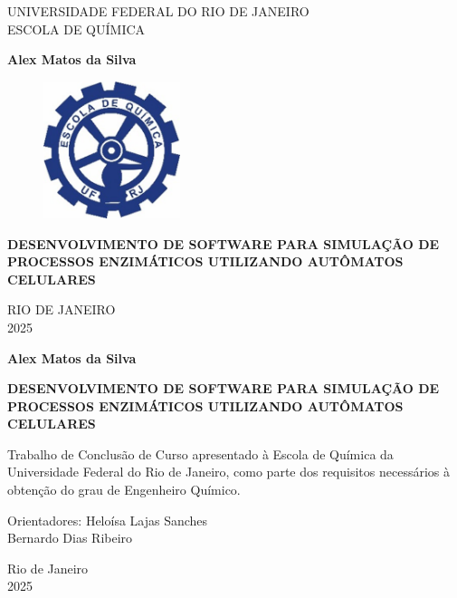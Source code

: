 \documentclass[12pt,oneside]{report}
\begin{document}
\onehalfspacing

\begin{titlepage}
    \begin{center}
        \large
        UNIVERSIDADE FEDERAL DO RIO DE JANEIRO \\
        ESCOLA DE QUÍMICA

        \vspace{2cm}

        \textbf{Alex Matos da Silva}

        \vspace{2cm}

        \begin{figure}[htp]
            \centering
            \includegraphics[width=4cm]{Logo-EQ.jpg}
        \end{figure}

        \vspace{2cm}

        \textbf{\Large DESENVOLVIMENTO DE SOFTWARE PARA SIMULAÇÃO DE PROCESSOS ENZIMÁTICOS UTILIZANDO AUTÔMATOS CELULARES}

        \vfill

        RIO DE JANEIRO \\
        2025
    \end{center}
\end{titlepage}

\begin{titlepage}
    \begin{center}
        \textbf{Alex Matos da Silva}

        \vfill

        \textbf{\Large DESENVOLVIMENTO DE SOFTWARE PARA SIMULAÇÃO DE PROCESSOS ENZIMÁTICOS UTILIZANDO AUTÔMATOS CELULARES}

        \vfill

    \end{center}
    Trabalho de Conclusão de Curso apresentado à Escola de Química da Universidade Federal do Rio de Janeiro, como parte dos requisitos necessários à obtenção do grau de Engenheiro Químico.

    \vfill

    \noindent Orientadores: Heloísa Lajas Sanches \\
    \phantom{Orientadores: }Bernardo Dias Ribeiro

    \vfill

    \begin{center}
        Rio de Janeiro \\
        2025
    \end{center}
\end{titlepage}
\end{document}
